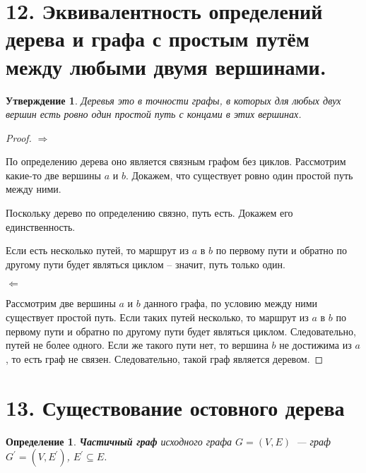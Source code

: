 \documentclass[a4paper,12pt]{article}
\newtheorem*{defin}{Определение}
\newtheorem*{Statements}{Утверждение}
\begin{document}
    \section*{12. Эквивалентность определений дерева и графа с простым путём
    между любыми двумя вершинами.}
    \begin{Statements}
        Деревья это в точности графы, в которых для любых двух вершин есть ровно
        один простой путь с концами в этих вершинах.
    \end{Statements}

    \begin{proof}
        \par $\Rightarrow$
        \par По определению дерева оно является связным графом без циклов.
        Рассмотрим какие-то две вершины $a$ и $b$. Докажем, что существует
        ровно один простой путь между ними.
        \par Поскольку дерево по определению связно, путь есть. Докажем его
        единственность.
        \par Если есть несколько путей, то маршрут из $a$ в $b$ по первому пути
        и обратно по другому пути будет являться циклом -- значит, путь только
        один.

        \par $\Leftarrow$
        \par Рассмотрим две вершины $a$ и $b$ данного графа, по условию между
        ними существует простой путь. Если таких путей несколько, то маршрут из
        $a$ в $b$ по первому пути и обратно по другому пути будет являться
        циклом. Следовательно, путей не более одного. Если же такого пути нет,
        то вершина $b$ не достижима из $a$, то есть граф не связен.
        Следовательно, такой граф является деревом.
    \end{proof}


 	\section*{13. Существование остовного дерева}
 	\begin{defin} \textbf{Частичный граф} исходного графа 
 		$G = (V, E)$ — граф $G^{\prime} = (V, E^{\prime})$, $E^{\prime} \subseteq E$.
	\end{defin}
\end{document}
